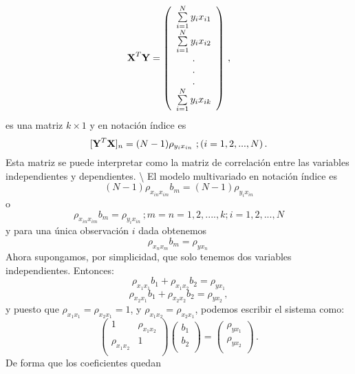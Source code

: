 \documentclass[
]{agujournal2019}
\begin{document}
\[{\textbf X}^T{\textbf Y}=\left(\begin{array}{c}
  \sum\limits_{i=1}^N y_i x_{i1}\\
  \sum\limits_{i=1}^N y_i x_{i2}\\
                   . \\
           . \\
           . \\
  \sum\limits_{i=1}^N y_i x_{ik}\\
        \end{array}\right)\,,\] es una matriz \(k\times 1\) y en
notación índice es
\[[{\textbf Y}^T{\textbf X}]_n=(N-1)\rho_{y_i x_{in}}\,\,;(i=1,2,...,N)\,.\]
Esta matriz se puede interpretar como la matriz de correlación entre las
variables independientes y dependientes. \textbackslash{} \noindent El
modelo multivariado en notación índice es
\[(N-1)\rho_{x_{in} x_{im}}b_m=(N-1)\rho_{y_i x_{in}}\] o
\[\rho_{x_{in} x_{im}}b_m=\rho_{y_i x_{in}}\,;m=n=1,2,....,k; i=1,2,...,N\]
y para una única observación \(i\) dada obtenemos
\[\rho_{x_{n} x_{m}}b_m=\rho_{y x_{n}}\,\] Ahora supongamos, por
simplicidad, que solo tenemos dos variables independientes. Entonces:
\[\rho_{x_{1} x_{1}}b_1+\rho_{x_{1} x_{2}}b_2=\rho_{y x_{1}}\]
\[\rho_{x_{2} x_{1}}b_1+\rho_{x_{2} x_{2}}b_2=\rho_{y x_{2}}\,,\] y
puesto que \(\rho_{x_{1} x_{1}}=\rho_{x_{2} x_{1}}=1\), y
\(\rho_{x_{1} x_{2}}=\rho_{x_{2} x_{1}}\), podemos escribir el sistema
como: \[\left(\begin{array}{cc}
  1 & \rho_{x_{1} x_{2}} \\
  \rho_{x_{1} x_{2}} & 1 \\
        \end{array}\right)
  \left(\begin{array}{c}
  b_1 \\
  b_2 \\
        \end{array}\right)=
     \left(\begin{array}{c}
  \rho_{y x_{1}} \\
  \rho_{y x_{2}} \\
        \end{array}\right)\,.\] De forma que los coeficientes quedan
\end{document}
